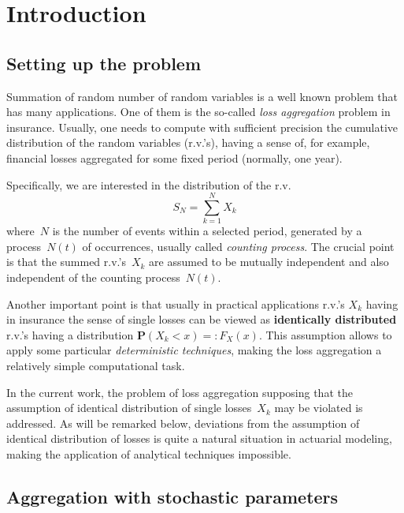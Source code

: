       \begin{multicols}{2}

      \label{st\stat}

\section{Introduction}


\subsection{Setting up the problem}

\noindent
Summation of random number of random variables is a well known
problem that has many applications. One of them is the so-called
{\it loss aggregation} problem in insurance. Usually, one needs to
compute with sufficient precision the cumulative distribution of the
random variables (r.v.'s), having a sense of, for example, financial losses aggregated
for some fixed period (normally, one year).


Specifically, we are interested in the distribution of the r.v.
\begin{equation}
\label{firstSum}
S_{N}=\sum\limits_{k=1}^{N}X_k
\end{equation}
where~$N$ is the number of events within a selected period,
generated by a process~$N(t)$ of occurrences, usually called {\it
counting process}. The crucial point is that the summed
r.v.'s~$X_k$ are assumed to be mutually independent and also
independent of the counting process~$N(t)$.

Another important point is that usually in practical applications
r.v.'s $X_k$ having in insurance the sense of single losses can be
viewed as {\bf identically distributed} r.v.'s having a
distribution $\mathbf{P}(X_k<x)=:F_X(x)$. This assumption allows to
apply some particular {\it deterministic techniques}, making the
loss aggregation a relatively simple computational task.

In the current work, the problem of loss aggregation
supposing that the assumption of identical distribution of single
losses~$X_k$ may be violated is addressed. As will be remarked below,
deviations from the assumption of identical distribution of losses
is quite a natural situation in actuarial modeling, making the
application of analytical techniques impossible.

\subsection{Aggregation with stochastic parameters}


\end{multicols}
